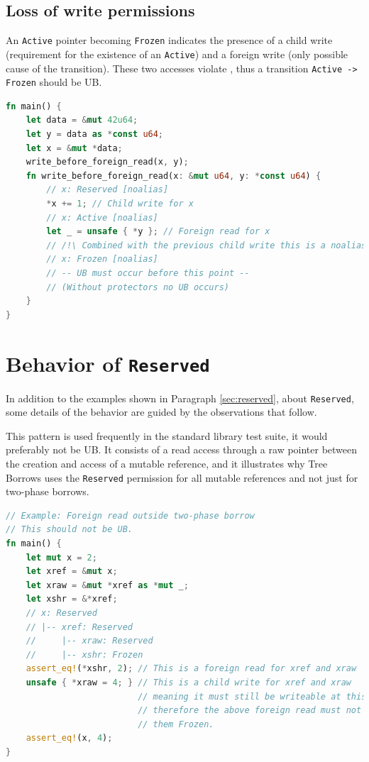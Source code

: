 \documentclass[a4paper,11pt]{article}
\theoremstyle{plain}
\theoremstyle{definition}
\theoremstyle{remark}
\newcommand{\tcode}[1]{\rstinline{#1}}
\newcommand{\tperm}[1]{\texttt{#1}}
\begin{document}
\subsection{Loss of write permissions}

An \tperm{Active} pointer becoming \tperm{Frozen} indicates the presence of a child write
(requirement for the existence of an \tperm{Active}) and a foreign write (only possible cause
of the transition). These two accesses violate \tcode{noalias}, thus a transition \tperm{Active -> Frozen}
should be UB.

\begin{lstlisting}[language=rust]
fn main() {
    let data = &mut 42u64;
    let y = data as *const u64;
    let x = &mut *data;
    write_before_foreign_read(x, y);
    fn write_before_foreign_read(x: &mut u64, y: *const u64) {
        // x: Reserved [noalias]
        *x += 1; // Child write for x
        // x: Active [noalias]
        let _ = unsafe { *y }; // Foreign read for x
        // /!\ Combined with the previous child write this is a noalias violation
        // x: Frozen [noalias]
        // -- UB must occur before this point --
        // (Without protectors no UB occurs)
    }
}
\end{lstlisting}

\newpage
\section{Behavior of \tperm{Reserved}}
\label{app:reserved}

In addition to the examples shown in Paragraph \ref{sec:reserved}, about
\tperm{Reserved}, some details of the behavior are guided by the observations
that follow.

This pattern is used frequently in the standard library test suite,
it would preferably not be UB.
It consists of a read access through a raw pointer between the creation
and access of a mutable reference, and it illustrates why Tree Borrows
uses the \tperm{Reserved} permission for all mutable references and not
just for two-phase borrows.
\begin{lstlisting}[language=rust]
// Example: Foreign read outside two-phase borrow
// This should not be UB.
fn main() {
    let mut x = 2;
    let xref = &mut x;
    let xraw = &mut *xref as *mut _;
    let xshr = &*xref;
    // x: Reserved
    // |-- xref: Reserved
    //     |-- xraw: Reserved
    //     |-- xshr: Frozen
    assert_eq!(*xshr, 2); // This is a foreign read for xref and xraw
    unsafe { *xraw = 4; } // This is a child write for xref and xraw
                          // meaning it must still be writeable at this point,
                          // therefore the above foreign read must not have turned
                          // them Frozen.
    assert_eq!(x, 4);
}
\end{lstlisting}
\end{document}
